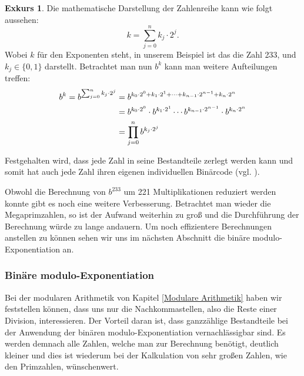 \documentclass[12pt,a4paper]{article}
\theoremstyle{definition}
\newtheorem{exkurs}{Exkurs}
\begin{document}
\begin{exkurs}
Die mathematische Darstellung der Zahlenreihe kann wie folgt aussehen:
\[k = \sum_{j=0}^n k_j \cdot 2^j.\]
Wobei $k$ für den Exponenten steht, in unserem Beispiel ist das die Zahl 233, und $k_j \in \{0, 1\}$ darstellt.
Betrachtet man nun $b^k$ kann man weitere Aufteilungen treffen:
\begin{align}\setcounter{equation}{0}
b^k = b^{\sum_{j=0}^n k_j \cdot 2^j} &= b^{k_0 \cdot 2^0 + k_1 \cdot 2^1 + \cdots + k_{n-1} \cdot 2^{n-1} + k_n \cdot 2^n} \\
                                    &= b^{k_0 \cdot 2^0} \cdot b^{k_1 \cdot 2^1} \cdots b^{k_{n-1} \cdot 2^{n-1}} \cdot b^{{k_n} \cdot 2^n} \\
                                    &= \prod_{j=0}^n b^{k_j \cdot 2^j}
\end{align}
\par
\endgroup

Festgehalten wird, dass jede Zahl in seine Bestandteile zerlegt werden kann und somit hat auch jede Zahl ihren eigenen individuellen Binärcode (vgl. \cite[130-132]{Meinel2015}).

Obwohl die Berechnung von $b^{233}$ um 221 Multiplikationen reduziert werden konnte gibt es noch eine weitere Verbesserung.
Betrachtet man wieder die Megaprimzahlen, so ist der Aufwand weiterhin zu groß und die Durchführung der Berechnung würde zu lange andauern.
Um noch effizientere Berechnungen anstellen zu können sehen wir uns im nächsten Abschnitt die binäre modulo-Exponentiation an.

\subsubsection{Binäre modulo-Exponentiation}\label{Binäre modulo-Exponentiation}
Bei der modularen Arithmetik von Kapitel \ref{Modulare Arithmetik} haben wir feststellen können, dass uns nur die Nachkommastellen, also die Reste einer Division, interessieren.
Der Vorteil daran ist, dass ganzzählige Bestandteile bei der Anwendung der binären modulo-Exponentiation vernachlässigbar sind.
Es werden demnach alle Zahlen, welche man zur Berechnung benötigt, deutlich kleiner und dies ist wiederum bei der Kalkulation von sehr großen Zahlen, wie den Primzahlen, wünschenwert.


\end{exkurs}
\end{document}

